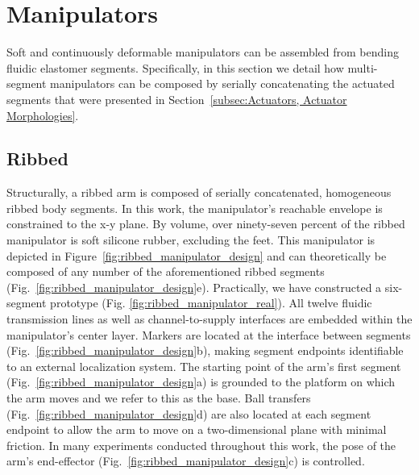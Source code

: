 \section{Manipulators}
\label{sec:Manipulators}
Soft and continuously deformable manipulators can be assembled from bending fluidic elastomer segments.
Specifically, in this section we detail how multi-segment manipulators can be composed by serially concatenating the actuated segments that were presented in Section~\ref{subsec:Actuators, Actuator Morphologies}.

\subsection{Ribbed}
\label{subsec:Manipulators, Ribbed}
Structurally, a ribbed arm is composed of serially concatenated, homogeneous ribbed body segments.
In this work, the manipulator's reachable envelope is constrained to the x-y plane.
By volume, over ninety-seven percent of the ribbed manipulator is soft silicone rubber, excluding the feet.
This manipulator is depicted in Figure~\ref{fig:ribbed_manipulator_design} and can theoretically be composed of any number of the aforementioned ribbed segments (Fig.~\ref{fig:ribbed_manipulator_design}e).
Practically, we have constructed a six-segment prototype (Fig. \ref{fig:ribbed_manipulator_real}).
All twelve fluidic transmission lines as well as channel-to-supply interfaces are embedded within the manipulator's center layer.
Markers are located at the interface between segments (Fig.~\ref{fig:ribbed_manipulator_design}b), making segment endpoints identifiable to an external localization system.
The starting point of the arm's first segment (Fig.~\ref{fig:ribbed_manipulator_design}a) is grounded to the platform on which the arm moves and we refer to this as the base.
Ball transfers (Fig.~\ref{fig:ribbed_manipulator_design}d) are also located at each segment endpoint to allow the arm to move on a two-dimensional plane with minimal friction.
In many experiments conducted throughout this work, the pose of the arm's end-effector (Fig.~\ref{fig:ribbed_manipulator_design}c) is controlled.

